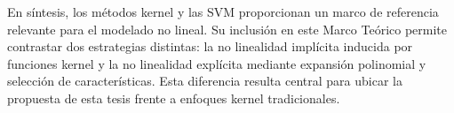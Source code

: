 En síntesis, los métodos kernel y las SVM proporcionan un marco de referencia relevante para el modelado no lineal. Su inclusión en este Marco Teórico permite contrastar dos estrategias distintas: la no linealidad implícita inducida por funciones kernel y la no linealidad explícita mediante expansión polinomial y selección de características. Esta diferencia resulta central para ubicar la propuesta de esta tesis frente a enfoques kernel tradicionales.
